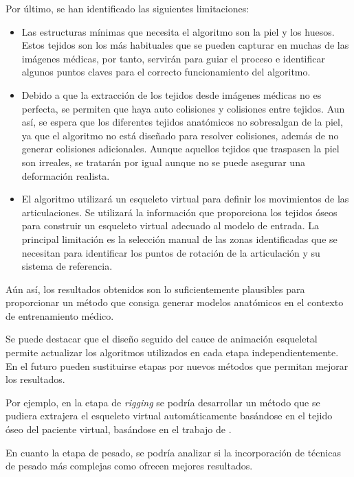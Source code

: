 Por último, se han identificado las siguientes limitaciones:
\begin{itemize}
    \item Las estructuras mínimas que necesita el algoritmo son la piel y los huesos. Estos tejidos son los más habituales que se pueden capturar en muchas de las imágenes médicas, por tanto, servirán para guiar el proceso e identificar algunos puntos claves para el correcto funcionamiento del algoritmo.
    
    \item Debido a que la extracción de los tejidos desde imágenes médicas no es perfecta, se permiten que haya auto colisiones y colisiones entre tejidos. Aun así, se espera que los diferentes tejidos anatómicos no sobresalgan de la piel, ya que el algoritmo no está diseñado para resolver colisiones, además de no generar colisiones adicionales. Aunque aquellos tejidos que traspasen la piel son irreales, se tratarán por igual aunque no se puede asegurar una deformación realista.
    
    \item El algoritmo utilizará un esqueleto virtual para definir los movimientos de las articulaciones. Se utilizará la información que proporciona los tejidos óseos para construir un esqueleto virtual adecuado al modelo de entrada. La principal limitación es la selección manual de las zonas identificadas que se necesitan para identificar los puntos de rotación de la articulación y su sistema de referencia.
\end{itemize}

Aún así, los resultados obtenidos son lo suficientemente plausibles para proporcionar un método que consiga generar modelos anatómicos en el contexto de entrenamiento médico.

Se puede destacar que el diseño seguido del cauce de animación esqueletal permite actualizar los algoritmos utilizados en cada etapa independientemente. En el futuro pueden sustituirse etapas por nuevos métodos que permitan mejorar los resultados. 

Por ejemplo, en la etapa de \emph{rigging} se podría desarrollar un método que se pudiera extrajera el esqueleto virtual automáticamente basándose en el tejido óseo del paciente virtual, basándose en el trabajo de \cite{Tagliasacchi}.

En cuanto la etapa de pesado, se podría analizar si la incorporación de técnicas de pesado más complejas como
\cite{Jacobson:2011} ofrecen mejores resultados.

